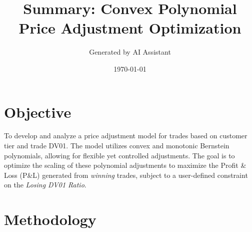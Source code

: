 \documentclass[11pt, a4paper]{article}
\title{Summary: Convex Polynomial Price Adjustment Optimization}
\author{Generated by AI Assistant} %
\date{\today}                 %
\begin{document}
\maketitle

\section*{Objective}
To develop and analyze a price adjustment model for trades based on customer tier and trade DV01. The model utilizes convex and monotonic Bernstein polynomials, allowing for flexible yet controlled adjustments. The goal is to optimize the scaling of these polynomial adjustments to maximize the Profit \& Loss (P\&L) generated from \textit{winning} trades, subject to a user-defined constraint on the \textit{Losing DV01 Ratio}.

\section*{Methodology}
\end{document}
